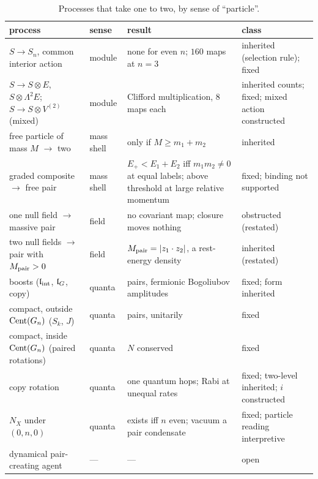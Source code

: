 \begin{table}[!htbp]
\centering
\footnotesize
\begin{tabular}{@{}>{\raggedright\arraybackslash}p{4.0cm}>{\raggedright\arraybackslash}p{1.8cm}>{\raggedright\arraybackslash}p{5.3cm}>{\raggedright\arraybackslash}p{3.6cm}@{}}
\toprule
process & sense & result & class\\
\midrule
$S\to S_n$, common interior action & module & none for even $n$; $160$ maps at $n=3$ & inherited (selection rule); fixed\\
$S\to S\otimes E$, $S\otimes\Lambda^2E$; $S\to S\otimes V^{(2)}$ (mixed) & module & Clifford multiplication, $8$ maps each & inherited counts; fixed; mixed action constructed\\
free particle of mass $M$ $\to$ two & mass shell & only if $M\ge m_1+m_2$ & inherited\\
graded composite $\to$ free pair & mass shell & $E_+<E_1+E_2$ iff $m_1m_2\neq0$ at equal labels; above threshold at large relative momentum & fixed; binding not supported\\
one null field $\to$ massive pair & field & no covariant map; closure moves nothing & obstructed (restated)\\
two null fields $\to$ pair with $M_{\rm pair}>0$ & field & $M_{\rm pair}=|z_1\cdot z_2|$, a rest-energy density & inherited (restated)\\
boosts ($\mathfrak l_{\rm int}$, $\mathfrak l_G$, copy) & quanta & pairs, fermionic Bogoliubov amplitudes & fixed; form inherited\\
compact, outside $\operatorname{Cent}(G_n)$ ($S_k$, $J$) & quanta & pairs, unitarily & fixed\\
compact, inside $\operatorname{Cent}(G_n)$ (paired rotations) & quanta & $N$ conserved & fixed\\
copy rotation & quanta & one quantum hops; Rabi at unequal rates & fixed; two-level inherited; $i$ constructed\\
$N_X$ under $(0,n,0)$ & quanta & exists iff $n$ even; vacuum a pair condensate & fixed; particle reading interpretive\\
dynamical pair-creating agent & --- & --- & open\\
\bottomrule
\end{tabular}
\caption{Processes that take one to two, by sense of ``particle''.}
\label{e2:tab:processes}
\end{table}

